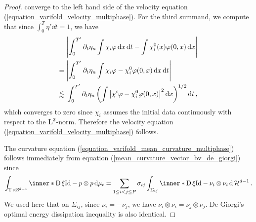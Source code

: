 \begin{proof}
	converge to the left hand side of the velocity equation 
	(\ref{equation_varifold_velocity_multiphase}). For the third summand, we 
	compute that since $ \int_{ 0 }^{ T } \eta' \dd{ t } = 1 $, we have
	\begin{align*}
		& \abs{
			\int_{ 0 }^{ T' }
			\partial_{ t } \eta_{ n }
			\int
			\chi_{ i }
			\varphi
			\dd{ x }
			\dd{t}
			-
			\int
			\chi^{ 0 }_{ i } ( x )
			\varphi ( 0 , x )
			\dd{ x }
		}
		\\
		={} &
		\abs{ 
			\int_{ 0 }^{ T' }
			\partial_{ t } \eta_{ n }
			\int
			\chi_{ i }
			\varphi
			-
			\chi^{ 0 }_{ i }
			\varphi ( 0 , x )
			\dd{ x }
			\dd{ t }
		}
		\\
		\lesssim{} &
		\int_{ 0 }^{ T' } 
		\partial_{ t } \eta_{ n }
		\left(
		\int
		\abs{ \chi^{ i } \varphi - \chi^{ 0 }_{ i } \varphi ( 0 , x 
			) 
		}^{ 2 }
		\dd{ x }
		\right)^{ 1/2 }
		\dd{ t },
	\end{align*}
	which converges to zero since $ \chi_{ i } $ assumes the initial data 
	continuously with respect to the $ \operatorname{L}^{ 2 } $-norm. Therefore the velocity 
	equation 
	(\ref{equation_varifold_velocity_multiphase}) follows.
	
	The curvature equation (\ref{equation_varifold_mean_curvature_multiphase}) 
	follows 
	immediately from equation (\ref{mean_curvature_vector_bv_de_giorgi})
	since
	\begin{equation*}
		\int_{ \flattorus \times \mathbb{ S }^{ d - 1 } }
		\inner*{ \diff \xi }{ \mathrm{Id} - p \otimes p }
		\dd{ \mu_{ t } }
		=
		\sum_{ 1 \leq i < j \leq P }
		\sigma_{ i j }
		\int_{ \Sigma_{ i j } }
		\inner*{ \diff \xi }{\mathrm{Id} - \nu_{i } \otimes \nu_{ i } }
		\dd{ \hm^{ d - 1 } }.
	\end{equation*}
	We used here that on $ \Sigma_{ i j } $, since $ \nu_{ i } = - \nu_{j } $, 
	we have $ \nu_{i } \otimes \nu_{ i } = \nu_{ j } \otimes \nu_{ j } $.
	De Giorgi's optimal energy dissipation inequality is also identical.
	

\end{proof}
